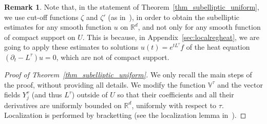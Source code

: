 \documentclass[10pt]{amsart}
\theoremstyle{definition}\newtheorem{defi}[theo]{Definition}\newtheorem{rema}[theo]{Remark}\newtheorem{exam}[theo]{Example}\newtheorem{exem}[theo]{Example}\newtheorem{nota}[theo]{Notation}
\newcommand*\R{\mathbb{R}}
\newcommand{\bbV}{\mathbb{V}}
\begin{document}
\begin{rema}
Note that, in the statement of Theorem~\ref{thm_subelliptic_uniform}, we use cut-off functions $\zeta$ and $\zeta'$ (as in~\cite{Kohn1973}), in order to obtain the subelliptic estimates for any smooth function $u$ on $\R^d$, and not only for any smooth function of compact support on $U$. This is because, in Appendix~\ref{sec:localregheat}, we are going to apply these estimates to solutions $u(t)=e^{t L^\tau}f$ of the heat equation $(\partial_t-L^\tau)u=0$, which are not of compact support.
\end{rema}


\begin{proof}[Proof of Theorem~\ref{thm_subelliptic_uniform}]
We only recall the main steps of the proof, without providing all details. We modify the function $\bbV^\tau$ and the vector fields $Y_j^\tau$ (and thus $L^\tau$) outside of $U$ so that their coefficients and all their derivatives are uniformly bounded on $\R^d$, uniformly with respect to $\tau$. Localization is performed by bracketting (see the localization lemma in~\cite{Kohn1973}).


\end{proof}
\end{document}
